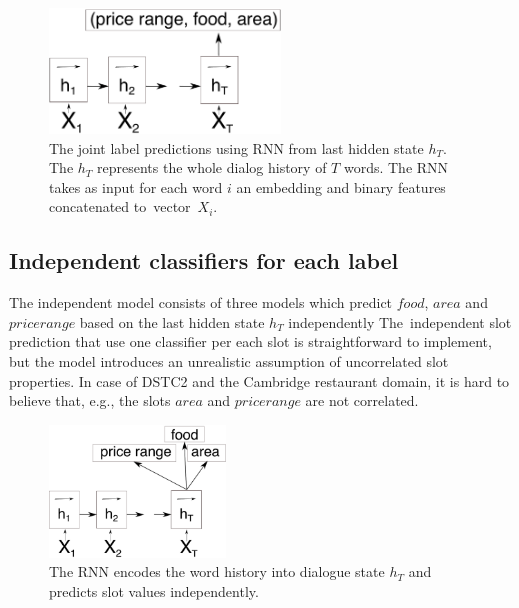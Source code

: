 \documentclass{itatnew}
\begin{document}
\begin{figure}
\vspace{-0.80em}
\begin{center}
\includegraphics[height=9em]{encoder_joint}
\caption{The joint label predictions using RNN from last hidden state $h_T$. The $h_T$ represents the whole dialog history of $T$ words. The RNN takes as input for each word $i$ an embedding and binary features concatenated to~vector~$X_{i}$.}
\end{center}
\vspace{-0.70em}
\label{fig_encjoint}
\end{figure}

\subsection{Independent classifiers for each label}
\label{sec:indep}
The independent model consists of three models which predict $food$, $area$ and $price range$ based on the last hidden state $h_{T}$ independently
The~independent slot prediction that use one classifier per each slot is straightforward to implement, but the model introduces an unrealistic assumption of uncorrelated slot properties.
In case of DSTC2 and the Cambridge restaurant domain, it is hard to believe that, e.g., the slots $area$ and $price range$ are not correlated.

\begin{figure}
\begin{center}
\includegraphics[height=9.5em]{encoder}
\caption{The RNN encodes the word history into dialogue state $h_T$ and predicts slot values independently.}
\end{center}
\vspace{-0.80em}
\label{fig:encind}
\end{figure}
\end{document}
